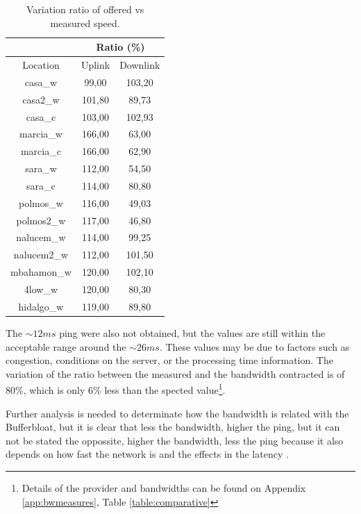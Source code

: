 \begin{table}[ht]
\begin{center}
\begin{tabular}{|c||c|c||}
 \hline
& \multicolumn{2}{|c|}{Ratio (\%)} \\ \hline
Location	& Uplink		& Downlink \\ \hline \hline
casa\_w		& 99,00			& 103,20 \\ \hline
casa2\_w	& 101,80		&  89,73  \\ \hline
casa\_c		& 103,00		& 102,93  \\ \hline
marcia\_w	& 166,00		&  63,00  \\ \hline
marcia\_c	& 166,00		&  62,90  \\ \hline
sara\_w		& 112,00		&  54,50  \\ \hline
sara\_c		& 114,00		&  80,80 \\ \hline
polmos\_w	& 116,00		&  49,03  \\ \hline
polmos2\_w 	& 117,00		&  46,80  \\ \hline
nalucem\_w	& 114,00		&  99,25  \\ \hline
nalucem2\_w & 112,00		& 101,50  \\ \hline
mbahamon\_w & 120,00		& 102,10  \\ \hline
4low\_w	 	& 120,00		&  80,30  \\ \hline
hidalgo\_w 	& 119,00		&  89,80  \\ \hline
\end{tabular}
\caption[Speed Test: Variation ratio of offered vs measured speed ]{Variation ratio of offered vs measured speed.}
\label{table:ratiospeed}
\end{center}
\end{table}

The $\sim12ms$ ping were also not obtained, but the values ​​are still within
the acceptable range around the $\sim26ms$. These values ​​may be due to
factors such as congestion, conditions on the server, or the processing time
information. The variation of the ratio between the measured and the bandwidth
contracted is of 80\%, which is only 6\% less than the spected
value\footnote{Details of the provider and bandwidths can be found on Appendix
\ref{app:bwmeasures}, Table \ref{table:comparative}}.

Further analysis is needed to determinate how the bandwidth is related with
the Bufferbloat, but it is clear that less the bandwidth, higher the ping, but
it can not be stated the oppossite, higher the bandwidth, less the ping
because it also depends on how fast the network is and the effects in the
latency \cite{main:ref:3}.

